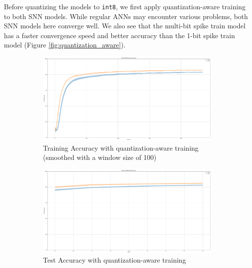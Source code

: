     Before quantizing the models to \verb|int8|, we first apply quantization-aware training to both SNN models. While regular ANNs may encounter various problems, both SNN models here converge well. We also see that the multi-bit spike train model has a faster convergence speed and better accuracy than the 1-bit spike train model (Figure \ref{fig:quantization_aware}). 
    \begin{figure}[!htpb]
        \centering
        \begin{subfigure}[H]{0.48\textwidth}
            \centering
            \includegraphics[width=\textwidth]{../quantized/FashionMNIST/plots/fashionmnist_train_acc.pdf}
            \caption{Training Accuracy with quantization-aware training (smoothed with a window size of 100)}
        \end{subfigure}
        \hfill
        \begin{subfigure}[H]{0.48\textwidth}
            \centering
            \includegraphics[width=\textwidth]{../quantized/FashionMNIST/plots/fashionmnist_test_acc.pdf}
            \caption{Test Accuracy with quantization-aware training}
        \end{subfigure}
        \hfill
        \begin{subfigure}[H]{\textwidth}

\end{subfigure}
\end{figure}
